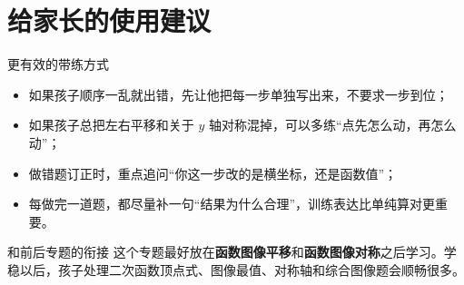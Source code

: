 \documentclass[11pt,a4paper,fontset=fandol]{ctexart}
\begin{document}
\section{给家长的使用建议}

\begin{warnbox}{更有效的带练方式}
\begin{itemize}
  \item 如果孩子顺序一乱就出错，先让他把每一步单独写出来，不要求一步到位；
  \item 如果孩子总把左右平移和关于 \(y\) 轴对称混掉，可以多练“点先怎么动，再怎么动”；
  \item 做错题订正时，重点追问“你这一步改的是横坐标，还是函数值”；
  \item 每做完一道题，都尽量补一句“结果为什么合理”，训练表达比单纯算对更重要。
\end{itemize}
\end{warnbox}

\begin{infobox}{和前后专题的衔接}
这个专题最好放在\textbf{函数图像平移}和\textbf{函数图像对称}之后学习。学稳以后，孩子处理二次函数顶点式、图像最值、对称轴和综合图像题会顺畅很多。
\end{infobox}
\end{document}

